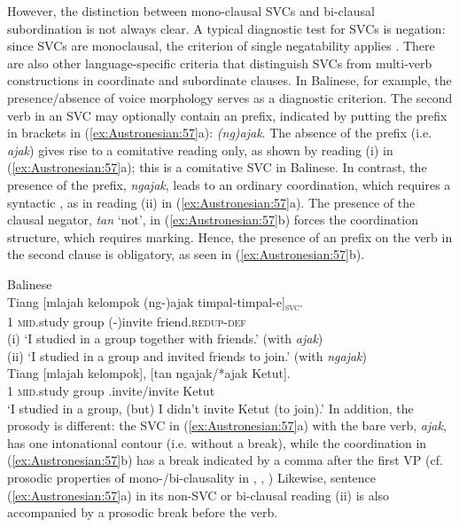 \documentclass[output=paper,chinesefont]{../langscibook}
\begin{document}
However, the distinction between mono-clausal SVCs and bi-clausal subordination is not always clear. A typical diagnostic test for SVCs is negation: since SVCs are monoclausal, the criterion of single negatability applies \citep{Durie1997}. There are also other language-specific criteria that distinguish SVCs from multi-verb constructions in coordinate and subordinate clauses. In Balinese, for example, the presence/absence of voice morphology serves as a diagnostic criterion. The second verb in an SVC may optionally contain an \AV prefix, indicated by putting the \AV prefix in brackets in (\ref{ex:Austronesian:57}a): \emph{(ng)ajak}. The absence of the \AV prefix (i.e. \emph{ajak}) gives rise to a comitative reading only, as shown by reading (i) in (\ref{ex:Austronesian:57}a); this is a comitative SVC in Balinese. In contrast, the presence of the \AV prefix, \emph{ngajak}, leads to an ordinary coordination, which requires a syntactic \PIVOT, as in reading (ii) in (\ref{ex:Austronesian:57}a). The presence of the clausal negator, \emph{tan} `not', in (\ref{ex:Austronesian:57}b) forces the coordination structure, which requires \SUBJ\PIVOT marking. Hence, the presence of an \AV prefix on the verb in the second clause is obligatory, as seen in (\ref{ex:Austronesian:57}b).

\newpage
\ea\label{ex:Austronesian:57} Balinese  \citep{ShioharaArka}\\
\ea\gll
Tiang [mlajah kelompok (ng-)ajak timpal-timpal-e]\textsubscript{\textsc{svc}}. \\
{1\SG} \phantom{[}\textsc{mid}.study group (\AV-)invite friend.\textsc{redup}-\textsc{def}\\
\glt (i) `I studied in a group together with friends.' (with \emph{ajak})\\
(ii) `I studied in a group and invited friends to join.' (with \emph{ngajak})\\
\ex\gll
Tiang [mlajah kelompok], [tan ngajak/*ajak Ketut].\\
{1\SG} \phantom{[}\textsc{mid}.study group \phantom{[}{\NEG} \AV.invite/invite Ketut\\
\glt`I studied in a group, (but) I didn't invite Ketut (to join).'
\z\z
In addition, the prosody is different: the SVC in (\ref{ex:Austronesian:57}a) with the bare verb, \emph{ajak}, has one intonational contour (i.e. without a break), while the coordination in (\ref{ex:Austronesian:57}b) has a break indicated by a comma after the first VP (cf. prosodic properties of mono-/bi-clausality in \citealt[7]{Aikhenvald2006}, \citealt[339]{Dixon2006}, \citealt[308]{Haspelmath2016})
 Likewise, sentence (\ref{ex:Austronesian:57}a) in its non-SVC or bi-clausal reading (ii) is also accompanied by a prosodic break before the \AV verb.
\end{document}
